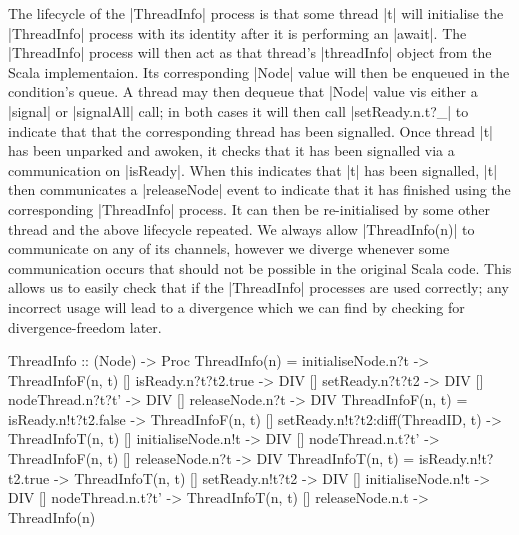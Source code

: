 The lifecycle of the |ThreadInfo| process is that some thread |t| will initialise the |ThreadInfo| process with its identity after it is performing an |await|. The |ThreadInfo| process will then act as that thread's |threadInfo| object from the Scala implementaion. Its corresponding |Node| value will then be enqueued in the condition's queue. A thread may then dequeue that |Node| value vis either a |signal| or |signalAll| call; in both cases it will then call |setReady.n.t?_| to indicate that that the corresponding thread has been signalled. Once thread |t| has been unparked and awoken, it checks that it has been signalled via a communication on |isReady|. When this indicates that |t| has been signalled, |t| then communicates a |releaseNode| event to indicate that it has finished using the corresponding |ThreadInfo| process. It can then be re-initialised by some other thread and the above lifecycle repeated.
We always allow |ThreadInfo(n)| to communicate on any of its channels, however we diverge whenever some communication occurs that should not be possible in the original Scala code. This allows us to easily check that if the |ThreadInfo| processes are used correctly; any incorrect usage will lead to a divergence which we can find by checking for divergence-freedom later.

\begin{cspm}[caption={The definition of a {\scalastyle ThreadInfo} process}]
ThreadInfo :: (Node) -> Proc
ThreadInfo(n) = 
      initialiseNode.n?t -> ThreadInfoF(n, t)
  [] isReady.n?t?t2.true -> DIV
  [] setReady.n?t?t2 -> DIV
  [] nodeThread.n?t?t' -> DIV
  [] releaseNode.n?t -> DIV
ThreadInfoF(n, t) =  
      isReady.n!t?t2.false -> ThreadInfoF(n, t)
  [] setReady.n!t?t2:diff(ThreadID, t) -> ThreadInfoT(n, t)
  [] initialiseNode.n!t -> DIV
  [] nodeThread.n.t?t' -> ThreadInfoF(n, t)
  [] releaseNode.n?t -> DIV
ThreadInfoT(n, t) = 
      isReady.n!t?t2.true -> ThreadInfoT(n, t)
  [] setReady.n!t?t2 -> DIV
  [] initialiseNode.n!t -> DIV
  [] nodeThread.n.t?t' -> ThreadInfoT(n, t)
  [] releaseNode.n.t -> ThreadInfo(n)
\end{cspm}

